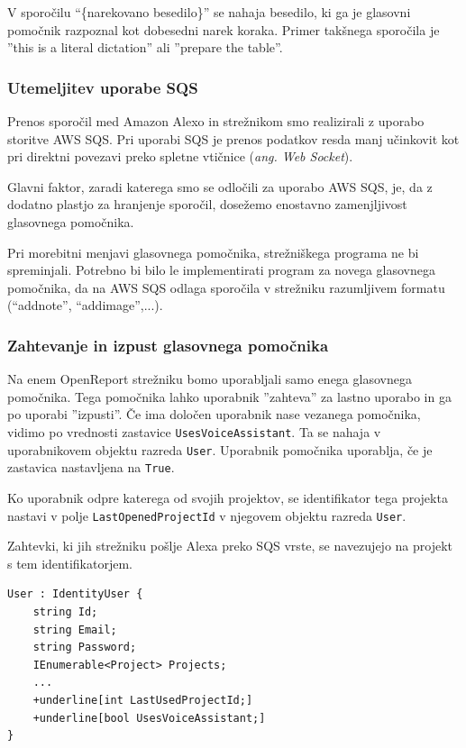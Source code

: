 \documentclass[a4paper, 12pt]{book}
\begin{document}
V sporočilu \enquote{\{narekovano besedilo\}} se nahaja besedilo, ki ga je glasovni pomočnik razpoznal kot dobesedni narek koraka.
Primer takšnega sporočila je ''this is a literal dictation'' ali ''prepare the table''.

\subsubsection{Utemeljitev uporabe SQS}

Prenos sporočil med Amazon Alexo in strežnikom smo realizirali z uporabo storitve AWS SQS.
Pri uporabi SQS je prenos podatkov resda manj učinkovit kot pri direktni povezavi preko spletne vtičnice (\textit{ang. Web Socket}).

Glavni faktor, zaradi katerega smo se odločili za uporabo AWS SQS, je, da z dodatno plastjo za hranjenje sporočil, dosežemo enostavno zamenjljivost glasovnega pomočnika.

Pri morebitni menjavi glasovnega pomočnika, strežniškega programa ne bi spreminjali.
Potrebno bi bilo le implementirati program za novega glasovnega pomočnika, da na AWS SQS odlaga sporočila v strežniku razumljivem formatu (\enquote{addnote}, \enquote{addimage},...).

\subsubsection{Zahtevanje in izpust glasovnega pomočnika}

Na enem OpenReport strežniku bomo uporabljali samo enega glasovnega pomočnika.
Tega pomočnika lahko uporabnik ''zahteva'' za lastno uporabo in ga po uporabi ''izpusti''.
Če ima določen uporabnik nase vezanega pomočnika, vidimo po vrednosti zastavice \texttt{UsesVoiceAssistant}.
Ta se nahaja v uporabnikovem objektu razreda \texttt{User}.
Uporabnik pomočnika uporablja, če je zastavica nastavljena na \texttt{True}.

Ko uporabnik odpre katerega od svojih projektov, se identifikator tega projekta nastavi v polje \texttt{LastOpenedProjectId} v njegovem objektu razreda \texttt{User}.

Zahtevki, ki jih strežniku pošlje Alexa preko SQS vrste, se navezujejo na projekt s tem identifikatorjem.

\begin{Verbatim}[commandchars=+\[\]]
User : IdentityUser {
    string Id; 
    string Email;
    string Password; 
    IEnumerable<Project> Projects;
    ... 
    +underline[int LastUsedProjectId;]
    +underline[bool UsesVoiceAssistant;]
}
\end{Verbatim}
\end{document}

